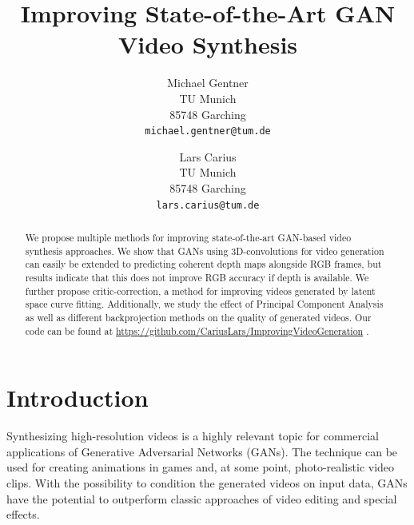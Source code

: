 \documentclass[10pt,twocolumn,letterpaper]{article}
\begin{document}
\setlength{\textfloatsep}{0.7\baselineskip plus 0.2\baselineskip minus 0.5\baselineskip}
\setlength{\abovedisplayskip}{4pt}
\setlength{\belowdisplayskip}{4pt}
\setlength{\abovedisplayshortskip}{0pt}
\setlength{\belowdisplayshortskip}{0pt}
\title{Improving State-of-the-Art GAN Video Synthesis}

\author{Michael Gentner\\
TU Munich\\
85748 Garching\\
{\tt\small michael.gentner@tum.de}
\and
Lars Carius\\
TU Munich\\
85748 Garching\\
{\tt\small lars.carius@tum.de}
}

\maketitle

\begin{abstract}
We propose multiple methods for improving state-of-the-art GAN-based video synthesis approaches. We show that GANs using 3D-convolutions for video generation can easily be extended to predicting coherent depth maps alongside RGB frames, but results indicate that this does not improve RGB accuracy if depth is available. We further propose critic-correction, a method for improving videos generated by latent space curve fitting. Additionally, we study the effect of Principal Component Analysis as well as different backprojection methods on the quality of generated videos. Our code can be found at \url{https://github.com/CariusLars/ImprovingVideoGeneration} .
\end{abstract}

\section{Introduction}

Synthesizing high-resolution videos is a highly relevant topic for commercial applications of Generative Adversarial Networks (GANs). The technique can be used for creating animations in games and, at some point, photo-realistic video clips. With the possibility to condition the generated videos on input data, GANs have the potential to outperform classic approaches of video editing and special effects.
\end{document}

